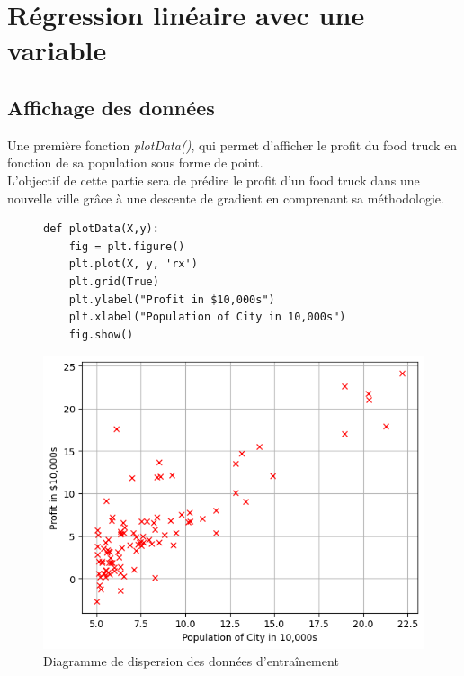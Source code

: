 \section{Régression linéaire avec une variable}
\subsection{Affichage des données}

Une première fonction \textit{plotData()}, qui permet d'afficher le profit du food truck en fonction de sa population sous forme de point. \\
L'objectif de cette partie sera de prédire le profit d'un food truck dans une nouvelle ville grâce à une descente de gradient en comprenant sa méthodologie.

\begin{figure}[!h]
    \begin{minipage}{.48\linewidth}
\begin{verbatim}
def plotData(X,y):
    fig = plt.figure()
    plt.plot(X, y, 'rx')
    plt.grid(True)
    plt.ylabel("Profit in $10,000s")
    plt.xlabel("Population of City in 10,000s")
    fig.show()
\end{verbatim}   
    \end{minipage}\hfill
    \begin{minipage}{.48\linewidth}
        \begin{center}
            \includegraphics[width=1\textwidth]{./img/4-1.png}
            \caption{\label{fig:fig1}Diagramme de dispersion des données d'entraînement}  
        \end{center}
    \end{minipage}
\end{figure}



